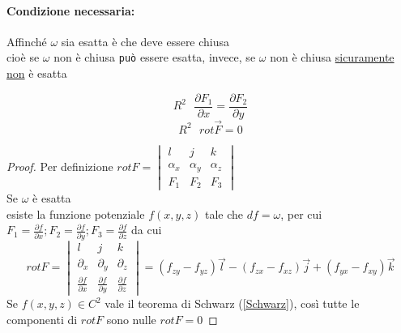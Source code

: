 \documentclass{book}
\begin{document}
\paragraph{Condizione necessaria:} Affinché $\omega$ sia esatta è che deve
essere chiusa\\
cioè se $\omega$ non è chiusa \texttt{può} essere esatta,
invece, se $\omega$ non è chiusa \underline{sicuramente \color{red} non} è esatta
\begin{multicols}{2}
	\begin{equation*}
		R^2\text{ }\frac{\partial F_1}{\partial x}=\frac{\partial F_2}{\partial y}
	\end{equation*}
	\begin{equation*}
		R^2\text{ } rot \vec{F}=0
	\end{equation*}
\end{multicols}
\begin{proof}
	Per definizione $rot F=\begin{vmatrix}
		l & j & k \\
		\alpha_x & \alpha_y & \alpha_z\\
		F_1 & F_2 & F_3
	\end{vmatrix}$\\
	Se $\omega$ è esatta\\
	esiste la funzione potenziale $f(x,y,z)$ tale che $df=\omega$, per cui
	$F_1=\frac{\partial f}{\partial x};F_2=\frac{\partial f}{\partial y};
	F_3=\frac{\partial f}{\partial z}$ da cui
	\begin{equation*}
		rot F=\begin{vmatrix}
			l & j & k\\
			\partial_x &\partial_y & \partial_z \\
			\frac{\partial f}{\partial x} &\frac{\partial f}{\partial
			y} & \frac{\partial f}{\partial z}
		\end{vmatrix}=(f_{zy}-f_{yz})\vec{l} - (f_{zx}-f_{xz})\vec{j}+
		(f_{yx}-f_{xy})\vec{k}
	\end{equation*}
	Se $f(x,y,z)\in C^2$ vale il teorema di Schwarz (\ref{Schwarz}), così tutte
	le componenti di $rot F$ sono nulle $rot F = 0$
\end{proof}
\end{document}
